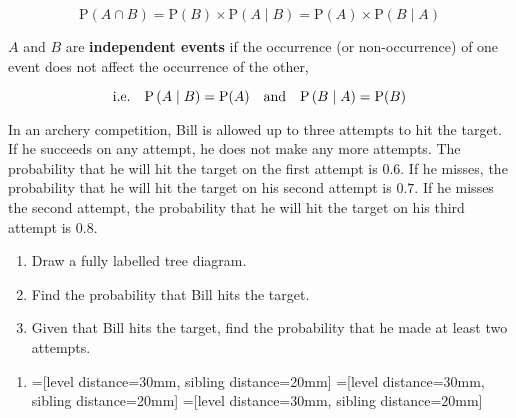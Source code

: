 \documentclass[11pt,a4paper]{book}
\begin{document}
\[
\text{P}\left(A\cap B\right)=\text{P}\left(B\right)\times\text{P}\left(A\mid B\right)=\text{P}\left(A\right)\times\text{P}\left(B\mid A\right)
\]

$A$ and $B$ are \textbf{independent events} if the occurrence (or non-occurrence) of one event does not affect the occurrence of the other,

\[
\text{i.e.}\quad\text{P}\left(A\mid B\right)=\text{P\ensuremath{\left(A\right)}}\quad\text{and}\quad\text{P}\left(B\mid A\right)=\text{P\ensuremath{\left(B\right)}}
\]


\newpage

\begin{example}

In an archery competition, Bill is allowed up to three attempts to
hit the target. If he succeeds on any attempt, he does not make any
more attempts. The probability that he will hit the target on the
first attempt is $0.6$. If he misses, the probability that he will
hit the target on his second attempt is $0.7$. If he misses the second
attempt, the probability that he will hit the target on his third
attempt is $0.8$.

\begin{enumerate}[label=(\alph*)]

\item Draw a fully labelled tree diagram.

\item Find the probability that Bill hits the target.

\item Given that Bill hits the target, find the probability that
he made at least two attempts.

\end{enumerate}

\Solution

\begin{enumerate}[label=(\alph*)]

\item \leavevmode\vadjust{\vspace{-\baselineskip}}\newline {}=[level distance=30mm, sibling distance=20mm]
=[level distance=30mm, sibling distance=20mm]
=[level distance=30mm, sibling distance=20mm]
\end{enumerate}
\end{example}
\end{document}

